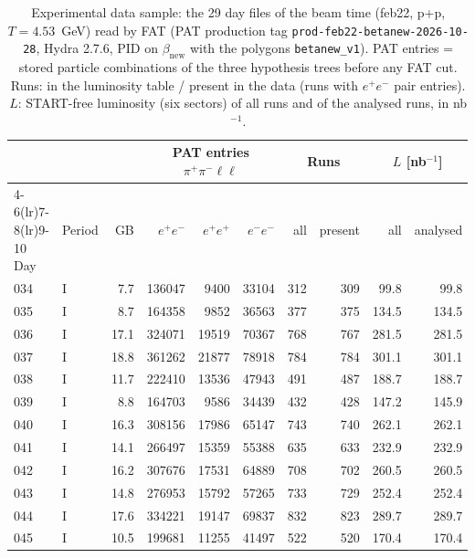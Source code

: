 \begin{table}[H]
\centering\footnotesize
\setlength{\tabcolsep}{3.5pt}
\caption{Experimental data sample: the 29 day files of the beam time (feb22, p+p, $T=4.53$~GeV) read by FAT (PAT production tag \texttt{prod-feb22-betanew-2026-10-28}, Hydra 2.7.6, PID on $\beta_\mathrm{new}$ with the polygons \texttt{betanew\_v1}). PAT entries = stored particle combinations of the three hypothesis trees before any FAT cut. Runs: in the luminosity table / present in the data (runs with $e^+e^-$ pair entries). $L$: START-free luminosity (six sectors) of all runs and of the analysed runs, in nb$^{-1}$.}
\label{tab:smp_samples}
\begin{tabular}{llr rrr rr rr}
\toprule
 & & & \multicolumn{3}{c}{PAT entries $\pi^+\pi^-\ell\ell$} & \multicolumn{2}{c}{Runs} & \multicolumn{2}{c}{$L$ [nb$^{-1}$]} \\
\cmidrule(lr){4-6}\cmidrule(lr){7-8}\cmidrule(lr){9-10}
Day & Period & GB & $e^+e^-$ & $e^+e^+$ & $e^-e^-$ & all & present & all & analysed \\
\midrule
034 & I & 7.7 & 136047 & 9400 & 33104 & 312 & 309 & 99.8 & 99.8 \\
035 & I & 8.7 & 164358 & 9852 & 36563 & 377 & 375 & 134.5 & 134.5 \\
036 & I & 17.1 & 324071 & 19519 & 70367 & 768 & 767 & 281.5 & 281.5 \\
037 & I & 18.8 & 361262 & 21877 & 78918 & 784 & 784 & 301.1 & 301.1 \\
038 & I & 11.7 & 222410 & 13536 & 47943 & 491 & 487 & 188.7 & 188.7 \\
039 & I & 8.8 & 164703 & 9586 & 34439 & 432 & 428 & 147.2 & 145.9 \\
040 & I & 16.3 & 308156 & 17986 & 65147 & 743 & 740 & 262.1 & 262.1 \\
041 & I & 14.1 & 266497 & 15359 & 55388 & 635 & 633 & 232.9 & 232.9 \\
042 & I & 16.2 & 307676 & 17531 & 64889 & 708 & 702 & 260.5 & 260.5 \\
043 & I & 14.8 & 276953 & 15792 & 57265 & 733 & 729 & 252.4 & 252.4 \\
044 & I & 17.6 & 334221 & 19147 & 69837 & 832 & 823 & 289.7 & 289.7 \\
045 & I & 10.5 & 199681 & 11255 & 41497 & 522 & 520 & 170.4 & 170.4 \\

\end{tabular}
\end{table}
